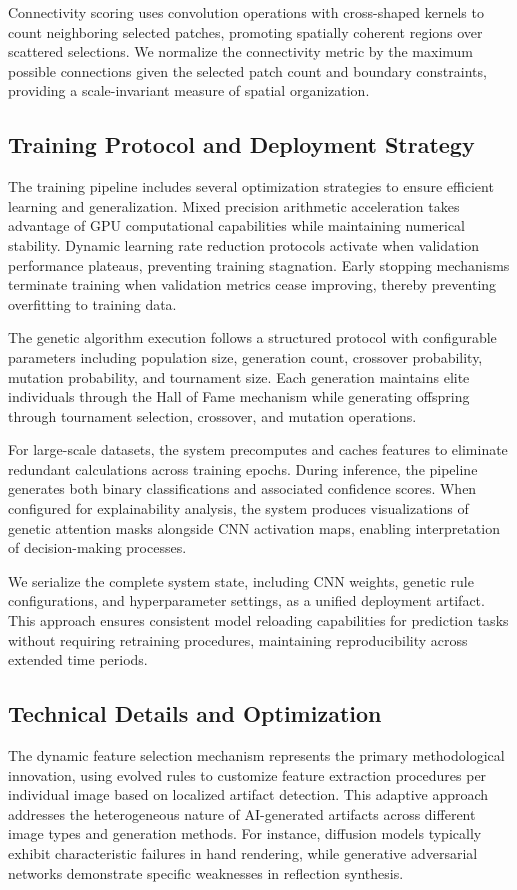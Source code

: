 \documentclass[runningheads]{llncs}
\begin{document}
Connectivity scoring uses convolution operations with cross-shaped kernels to count neighboring selected patches, promoting spatially coherent regions over scattered selections. We normalize the connectivity metric by the maximum possible connections given the selected patch count and boundary constraints, providing a scale-invariant measure of spatial organization.

\subsection{Training Protocol and Deployment Strategy}
The training pipeline includes several optimization strategies to ensure efficient learning and generalization. Mixed precision arithmetic acceleration takes advantage of GPU computational capabilities while maintaining numerical stability. Dynamic learning rate reduction protocols activate when validation performance plateaus, preventing training stagnation. Early stopping mechanisms terminate training when validation metrics cease improving, thereby preventing overfitting to training data.

The genetic algorithm execution follows a structured protocol with configurable parameters including population size, generation count, crossover probability, mutation probability, and tournament size. Each generation maintains elite individuals through the Hall of Fame mechanism while generating offspring through tournament selection, crossover, and mutation operations.

For large-scale datasets, the system precomputes and caches features to eliminate redundant calculations across training epochs. During inference, the pipeline generates both binary classifications and associated confidence scores. When configured for explainability analysis, the system produces visualizations of genetic attention masks alongside CNN activation maps, enabling interpretation of decision-making processes.

We serialize the complete system state, including CNN weights, genetic rule configurations, and hyperparameter settings, as a unified deployment artifact. This approach ensures consistent model reloading capabilities for prediction tasks without requiring retraining procedures, maintaining reproducibility across extended time periods.

\subsection{Technical Details and Optimization}
The dynamic feature selection mechanism represents the primary methodological innovation, using evolved rules to customize feature extraction procedures per individual image based on localized artifact detection. This adaptive approach addresses the heterogeneous nature of AI-generated artifacts across different image types and generation methods. For instance, diffusion models typically exhibit characteristic failures in hand rendering, while generative adversarial networks demonstrate specific weaknesses in reflection synthesis.
\end{document}
